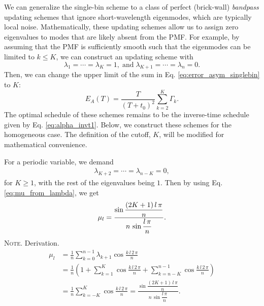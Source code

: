 \documentclass[reprint, superscriptaddress, floatfix]{revtex4-1}
\newcommand{\note}[1]{{\color{DarkGreen}\footnotesize \textsc{Note.} #1}}
\newcommand{\Err}{E}
\begin{document}
We can generalize
the single-bin scheme to a class of
perfect (brick-wall) \emph{bandpass} updating schemes
that ignore short-wavelength eigenmodes,
which are typically local noise.
%
Mathematically, these updating schemes
allow us to assign zero eigenvalues
to modes that are likely absent from the PMF.
%
For example,
by assuming
that the PMF is sufficiently smooth
such that the eigenmodes can be limited to $k \le K$,
%
we can construct an updating scheme with
$$
\lambda_1 = \cdots = \lambda_K = 1,
\mathrm{\; and \;}
\lambda_{K+1} = \cdots = \lambda_n = 0.
$$
%
Then,
we can change the upper limit of the sum in
Eq. \eqref{eq:error_asym_singlebin} to $K$:
%
%
\begin{equation}
  \Err_A(T)
  =
  \frac {       T     }
        { (T + t_0)^2 }
  \sum_{ k = 2 }^K
    \Gamma_k.
\label{eq:error_asym_sinc}
\end{equation}
%
The optimal schedule of these schemes
remains to be the inverse-time schedule
given by Eq. \eqref{eq:alpha_invt1}.
%
Below, we construct these schemes for
the homogeneous case.
%
The definition of the cutoff, $K$, will be modified
for mathematical convenience.

For a periodic variable, we demand
%
$$
\begin{aligned}
\lambda_{K+2} = \cdots = \lambda_{n-K} = 0,
\end{aligned}
$$
for $K \ge 1$,
with the rest of the eigenvalues being $1$.
%
Then by using
Eq. \eqref{eq:mu_from_lambda},
we get
\begin{equation}
  \mu_l
  =
  \frac{
    \sin
    \dfrac{ (2 K + 1) \, l \, \pi }
         {              n        }
  }
  {
    n \, \sin \dfrac{ l \, \pi } { n }
  }
  .
\notag
\end{equation}
\note{Derivation.
$$
\begin{aligned}
\mu_l
&=
\frac 1 n \sum_{k = 0}^{n-1} \lambda_{k+1} \cos \frac{ k \, l \, 2 \, \pi } { n }
\\
&=
\frac{1}{n}
\left(
  1 +
  \sum_{k=1}^K
  \cos \frac { k \, l \, 2 \, \pi } { n }
  +
  \sum_{k=n-K}^{n-1}
  \cos \frac { k \, l \, 2 \, \pi } { n }
\right)
\\
&=
\frac 1 n
\sum_{k=-K}^K
\cos \frac { k \, l \, 2 \, \pi } { n }
=
  \frac{
    \sin
    \dfrac{ (2 K + 1) \, l \, \pi }
         {              n        }
  }
  {
    n \, \sin \dfrac{ l \, \pi } { n }
  }
.
\end{aligned}
$$
}
\end{document}
